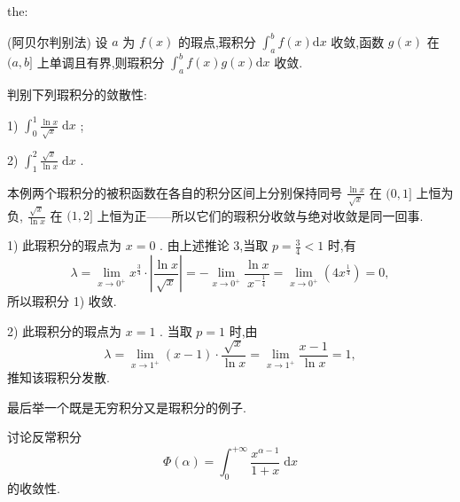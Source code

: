 \begin{theorem}{}{the:}

\end{theorem}
(阿贝尔判别法) 设 \(a\) 为 \(f\left( x\right)\) 的瑕点,瑕积分 \({\int }_{a}^{b}f\left( x\right) \mathrm{d}x\) 收敛,函数 \(g\left( x\right)\) 在 \((a,b\rbrack\) 上单调且有界,则瑕积分 \({\int }_{a}^{b}f\left( x\right) g\left( x\right) \mathrm{d}x\) 收敛.

\begin{example}

\end{example}
判别下列瑕积分的敛散性:

1) \({\int }_{0}^{1}\frac{\ln x}{\sqrt{x}}\mathrm{\;d}x\) ;

2) \({\int }_{1}^{2}\frac{\sqrt{x}}{\ln x}\mathrm{\;d}x\) .

\begin{solution}

\end{solution}
本例两个瑕积分的被积函数在各自的积分区间上分别保持同号 \(\frac{\ln x}{\sqrt{x}}\) 在 \((0,1\rbrack\) 上恒为负, \(\frac{\sqrt{x}}{\ln x}\) 在 \((1,2\rbrack\) 上恒为正——所以它们的瑕积分收敛与绝对收敛是同一回事.

1) 此瑕积分的瑕点为 \(x = 0\) . 由上述推论 3,当取 \(p = \frac{3}{4} < 1\) 时,有
\[
\lambda  = \mathop{\lim }\limits_{{x \rightarrow  {0}^{ + }}}{x}^{\frac{3}{4}} \cdot  \left| \frac{\ln x}{\sqrt{x}}\right|  =  - \mathop{\lim }\limits_{{x \rightarrow  {0}^{ + }}}\frac{\ln x}{{x}^{-\frac{1}{4}}} = \mathop{\lim }\limits_{{x \rightarrow  {0}^{ + }}}\left( {4{x}^{\frac{1}{4}}}\right)  = 0,
\]
所以瑕积分 1) 收敛.

2) 此瑕积分的瑕点为 \(x = 1\) . 当取 \(p = 1\) 时,由
\[
\lambda  = \mathop{\lim }\limits_{{x \rightarrow  {1}^{ + }}}\left( {x - 1}\right)  \cdot  \frac{\sqrt{x}}{\ln x} = \mathop{\lim }\limits_{{x \rightarrow  {1}^{ + }}}\frac{x - 1}{\ln x} = 1,
\]
推知该瑕积分发散.

最后举一个既是无穷积分又是瑕积分的例子.

\begin{example}

\end{example}
讨论反常积分
\[
\Phi \left( \alpha \right)  = {\int }_{0}^{+\infty }\frac{{x}^{\alpha  - 1}}{1 + x}\mathrm{\;d}x
\]
的收敛性.

